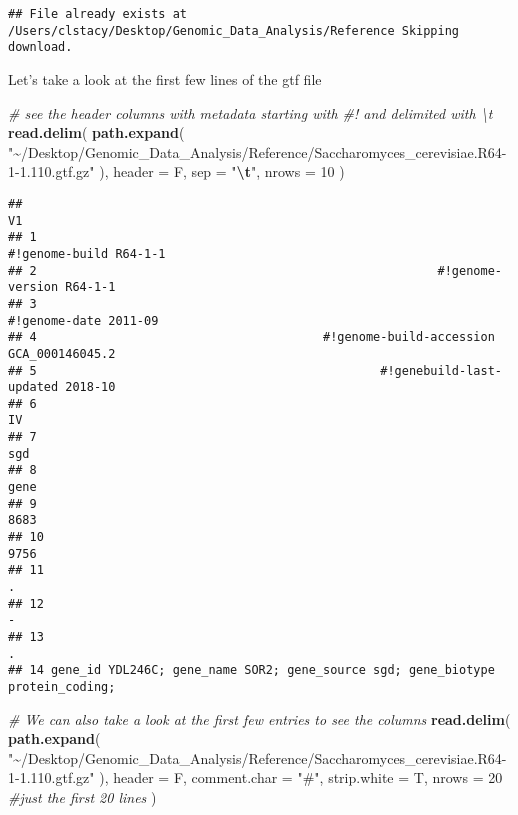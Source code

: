 \documentclass[
]{book}
\newenvironment{Shaded}{\begin{snugshade}}{\end{snugshade}}
\newcommand{\AttributeTok}[1]{\textcolor[rgb]{0.13,0.29,0.53}{#1}}
\newcommand{\CommentTok}[1]{\textcolor[rgb]{0.56,0.35,0.01}{\textit{#1}}}
\newcommand{\DecValTok}[1]{\textcolor[rgb]{0.00,0.00,0.81}{#1}}
\newcommand{\FunctionTok}[1]{\textcolor[rgb]{0.13,0.29,0.53}{\textbf{#1}}}
\newcommand{\NormalTok}[1]{#1}
\newcommand{\SpecialCharTok}[1]{\textcolor[rgb]{0.81,0.36,0.00}{\textbf{#1}}}
\newcommand{\StringTok}[1]{\textcolor[rgb]{0.31,0.60,0.02}{#1}}
\begin{document}
\begin{verbatim}
## File already exists at /Users/clstacy/Desktop/Genomic_Data_Analysis/Reference Skipping download.
\end{verbatim}

Let's take a look at the first few lines of the gtf file

\begin{Shaded}
\begin{Highlighting}[]
\CommentTok{\# see the header columns with metadata starting with \#! and delimited with \textbackslash{}t}
\FunctionTok{read.delim}\NormalTok{(}
  \FunctionTok{path.expand}\NormalTok{(}
    \StringTok{"\textasciitilde{}/Desktop/Genomic\_Data\_Analysis/Reference/Saccharomyces\_cerevisiae.R64{-}1{-}1.110.gtf.gz"}
\NormalTok{  ),}
  \AttributeTok{header =}\NormalTok{ F,}
  \AttributeTok{sep =} \StringTok{"}\SpecialCharTok{\textbackslash{}t}\StringTok{"}\NormalTok{,}
  \AttributeTok{nrows =} \DecValTok{10}
\NormalTok{)}
\end{Highlighting}
\end{Shaded}

\begin{verbatim}
##                                                                                V1
## 1                                                          #!genome-build R64-1-1
## 2                                                        #!genome-version R64-1-1
## 3                                                           #!genome-date 2011-09
## 4                                        #!genome-build-accession GCA_000146045.2
## 5                                                #!genebuild-last-updated 2018-10
## 6                                                                              IV
## 7                                                                             sgd
## 8                                                                            gene
## 9                                                                            8683
## 10                                                                           9756
## 11                                                                              .
## 12                                                                              -
## 13                                                                              .
## 14 gene_id YDL246C; gene_name SOR2; gene_source sgd; gene_biotype protein_coding;
\end{verbatim}

\begin{Shaded}
\begin{Highlighting}[]
\CommentTok{\# We can also take a look at the first few entries to see the columns}
\FunctionTok{read.delim}\NormalTok{(}
  \FunctionTok{path.expand}\NormalTok{(}
    \StringTok{"\textasciitilde{}/Desktop/Genomic\_Data\_Analysis/Reference/Saccharomyces\_cerevisiae.R64{-}1{-}1.110.gtf.gz"}
\NormalTok{  ),}
  \AttributeTok{header =}\NormalTok{ F,}
  \AttributeTok{comment.char =} \StringTok{"\#"}\NormalTok{,}
  \AttributeTok{strip.white =}\NormalTok{ T,}
  \AttributeTok{nrows =} \DecValTok{20} \CommentTok{\#just the first 20 lines}
\NormalTok{) }
\end{Highlighting}
\end{Shaded}
\end{document}
